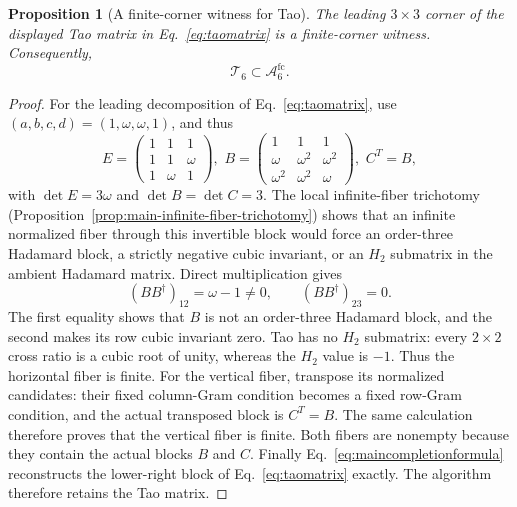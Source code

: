 \documentclass[aps,prx,reprint,nofootinbib,twoside,superscriptaddress,longbibliography,floatfix]{revtex4-2}
\newtheorem{proposition}[theorem]{Proposition}
\theoremstyle{definition}
\newcommand{\FCAtlas}{\mathcal A}
\begin{document}
\begin{proposition}[A finite-corner witness for Tao]
\label{prop:tao-finite-corner}
The leading $3\times3$ corner of the displayed Tao matrix in
Eq.~\eqref{eq:taomatrix} is a finite-corner witness. Consequently,
\begin{equation}
\mathcal T_6\subset\FCAtlas_6^{\mathrm{fc}}.
\label{eq:tao-finite-corner-main}
\end{equation}
\end{proposition}

\begin{proof}
For the leading decomposition of Eq.~\eqref{eq:taomatrix}, use
$(a,b,c,d)=(1,\omega,\omega,1)$, and thus
\begin{equation}
E=\begin{pmatrix}1&1&1\\1&1&\omega\\1&\omega&1\end{pmatrix}, 
\,\,
B=\begin{pmatrix}
1&1&1\\
\omega&\omega^2&\omega^2\\
\omega^2&\omega^2&\omega
\end{pmatrix},
\,\, C^T=B,
\label{eq:tao-seed-main}
\end{equation}
with $\det E=3\omega$ and $\det B=\det C=3$. The local infinite-fiber trichotomy (Proposition~\ref{prop:main-infinite-fiber-trichotomy}) shows that an infinite normalized fiber through this invertible block would force an order-three Hadamard block, a strictly negative cubic invariant, or an $H_2$ submatrix in the ambient Hadamard matrix. Direct multiplication gives
\begin{equation}
(BB^\dagger)_{12}=\omega-1\ne0,
\qquad
(BB^\dagger)_{23}=0.
\label{eq:tao-gram-check}
\end{equation}
The first equality shows that $B$ is not an order-three Hadamard block, and the second makes its row cubic invariant zero. Tao has no $H_2$ submatrix: every $2\times2$ cross ratio is a cubic root of unity, whereas the $H_2$ value is $-1$. Thus the horizontal fiber is finite. For the vertical fiber, transpose its normalized candidates: their fixed column-Gram condition becomes a fixed row-Gram condition, and the actual transposed block is $C^T=B$. The same calculation therefore proves that the vertical fiber is finite. Both fibers are nonempty because they contain the actual blocks $B$ and $C$. Finally Eq.~\eqref{eq:maincompletionformula} reconstructs the lower-right block of Eq.~\eqref{eq:taomatrix} exactly. The algorithm therefore retains the Tao matrix.
\end{proof}
\end{document}
